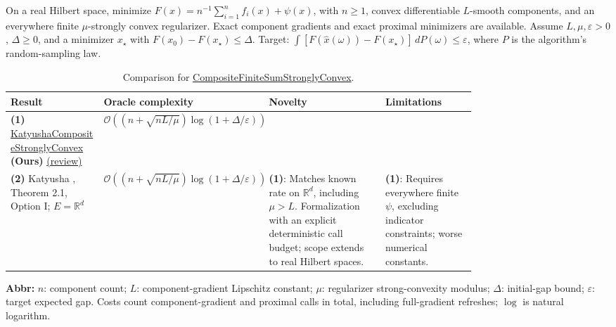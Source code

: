 \begin{table}[tp]
\centering
\caption{Comparison for \href{https://github.com/k3nfalt/longtails/blob/main/LongTails/Setups/CompositeFiniteSumStronglyConvex.lean}{CompositeFiniteSumStronglyConvex}.}\label{tab:CompositeFiniteSumStronglyConvex}
\parbox{\linewidth}{\footnotesize On a real Hilbert space, minimize $F(x)=n^{-1}\sum_{i=1}^{n}f_i(x)+\psi(x)$, with $n\ge1$, convex differentiable $L$-smooth components, and an everywhere finite $\mu$-strongly convex regularizer. Exact component gradients and exact proximal minimizers are available. Assume $L,\mu,\varepsilon>0$, $\Delta\ge0$, and a minimizer $x_\star$ with $F(x_0)-F(x_\star)\le\Delta$. Target: $\int [F(\widehat x(\omega))-F(x_\star)]\,dP(\omega)\le\varepsilon$, where $P$ is the algorithm's random-sampling law.}\par\smallskip
\begin{threeparttable}
\footnotesize
\setlength{\tabcolsep}{4pt}\renewcommand{\arraystretch}{1.25}
\begin{tabularx}{\linewidth}{@{}>{\raggedright\arraybackslash}p{0.20\linewidth}>{\raggedright\arraybackslash}p{0.32\linewidth}>{\raggedright\arraybackslash}p{0.25\linewidth}>{\raggedright\arraybackslash}X@{}}
\toprule
\textbf{Result} & \textbf{Oracle complexity} & \textbf{Novelty} & \textbf{Limitations} \\
\midrule
\textbf{(1)} \href{https://github.com/k3nfalt/longtails/blob/main/LongTails/Theorems/KatyushaCompositeStronglyConvex.lean}{Katyusha\allowbreak Composite\allowbreak Strongly\allowbreak Convex} \textbf{(Ours)} \href{https://github.com/k3nfalt/longtails/blob/main/scripts/reviews/KatyushaCompositeStronglyConvex.md}{(review)} & $\mathcal{O}\!\left((n+\sqrt{nL/\mu})\log(1+\Delta/\varepsilon)\right)$ & & \\
\midrule[1.2pt]
\textbf{(2)} Katyusha \citep{AllenZhu2018KatyushaComposite}, Theorem 2.1, Option I; $E=\mathbb{R}^d$ & $\mathcal{O}\!\left((n+\sqrt{nL/\mu})\log(1+\Delta/\varepsilon)\right)$ & \textbf{(1)}: Matches known rate on $\mathbb{R}^d$, including $\mu>L$. Formalization with an explicit deterministic call budget; scope extends to real Hilbert spaces. & \textbf{(1)}: Requires everywhere finite $\psi$, excluding indicator constraints; worse numerical constants. \\
\bottomrule
\end{tabularx}
\begin{tablenotes}[flushleft]\footnotesize
\item[] \textbf{Abbr:} $n$: component count; $L$: component-gradient Lipschitz constant; $\mu$: regularizer strong-convexity modulus; $\Delta$: initial-gap bound; $\varepsilon$: target expected gap. Costs count component-gradient and proximal calls in total, including full-gradient refreshes; $\log$ is natural logarithm.
\end{tablenotes}
\end{threeparttable}
\end{table}
\clearpage
